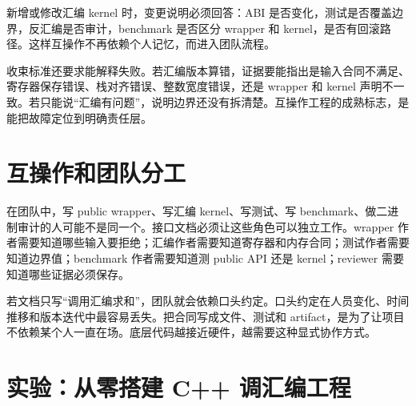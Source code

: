 新增或修改汇编 kernel 时，变更说明必须回答：ABI 是否变化，测试是否覆盖边界，反汇编是否审计，benchmark 是否区分 wrapper 和 kernel，是否有回滚路径。这样互操作不再依赖个人记忆，而进入团队流程。

收束标准还要求能解释失败。若汇编版本算错，证据要能指出是输入合同不满足、寄存器保存错误、栈对齐错误、整数宽度错误，还是 wrapper 和 kernel 声明不一致。若只能说“汇编有问题”，说明边界还没有拆清楚。互操作工程的成熟标志，是能把故障定位到明确责任层。

\section{互操作和团队分工}

在团队中，写 public wrapper、写汇编 kernel、写测试、写 benchmark、做二进制审计的人可能不是同一个。接口文档必须让这些角色可以独立工作。wrapper 作者需要知道哪些输入要拒绝；汇编作者需要知道寄存器和内存合同；测试作者需要知道边界值；benchmark 作者需要知道测 public API 还是 kernel；reviewer 需要知道哪些证据必须保存。

若文档只写“调用汇编求和”，团队就会依赖口头约定。口头约定在人员变化、时间推移和版本迭代中最容易丢失。把合同写成文件、测试和 artifact，是为了让项目不依赖某个人一直在场。底层代码越接近硬件，越需要这种显式协作方式。

\section{实验：从零搭建 C++ 调汇编工程}


